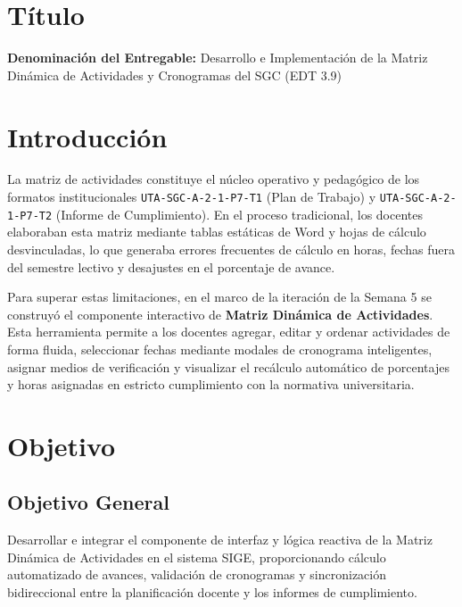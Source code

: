 \documentclass[12pt,a4paper]{article}
\begin{document}
\section{Título}
\textbf{Denominación del Entregable:} Desarrollo e Implementación de la Matriz Dinámica de Actividades y Cronogramas del SGC (EDT 3.9)

\section{Introducción}
La matriz de actividades constituye el núcleo operativo y pedagógico de los formatos institucionales \texttt{UTA-SGC-A-2-1-P7-T1} (Plan de Trabajo) y \texttt{UTA-SGC-A-2-1-P7-T2} (Informe de Cumplimiento). En el proceso tradicional, los docentes elaboraban esta matriz mediante tablas estáticas de Word y hojas de cálculo desvinculadas, lo que generaba errores frecuentes de cálculo en horas, fechas fuera del semestre lectivo y desajustes en el porcentaje de avance.

Para superar estas limitaciones, en el marco de la iteración de la Semana 5 se construyó el componente interactivo de \textbf{Matriz Dinámica de Actividades}. Esta herramienta permite a los docentes agregar, editar y ordenar actividades de forma fluida, seleccionar fechas mediante modales de cronograma inteligentes, asignar medios de verificación y visualizar el recálculo automático de porcentajes y horas asignadas en estricto cumplimiento con la normativa universitaria.

\section{Objetivo}

\subsection{Objetivo General}
Desarrollar e integrar el componente de interfaz y lógica reactiva de la Matriz Dinámica de Actividades en el sistema SIGE, proporcionando cálculo automatizado de avances, validación de cronogramas y sincronización bidireccional entre la planificación docente y los informes de cumplimiento.
\end{document}
